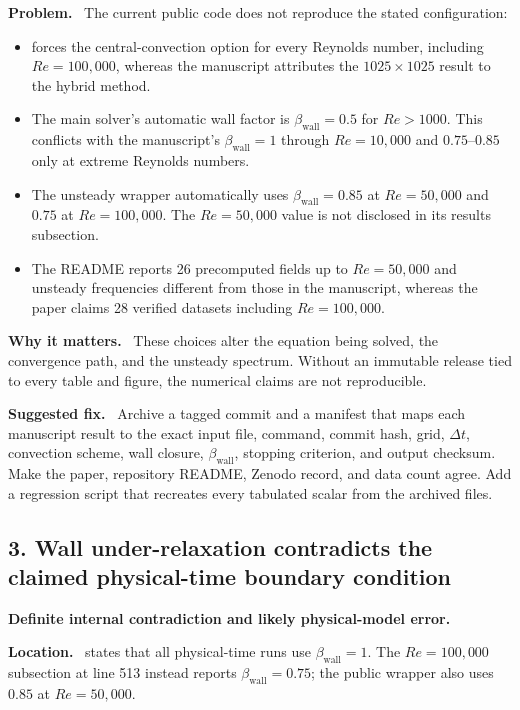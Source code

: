 \documentclass[11pt,a4paper]{article}
\newcommand{\classify}[1]{\textcolor{blue!65!black}{\textbf{#1}}}
\newcommand{\field}[1]{\par\noindent\textbf{#1}\ }
\begin{document}
\field{Problem.} The current public code does not reproduce the stated configuration:
\begin{itemize}
  \item {} forces the central-convection option for every Reynolds number, including $Re=100{,}000$, whereas the manuscript attributes the $1025\times1025$ result to the hybrid method.
  \item The main solver's automatic wall factor is $\beta_{\mathrm{wall}}=0.5$ for $Re>1000$. This conflicts with the manuscript's $\beta_{\mathrm{wall}}=1$ through $Re=10{,}000$ and $0.75$--$0.85$ only at extreme Reynolds numbers.
  \item The unsteady wrapper automatically uses $\beta_{\mathrm{wall}}=0.85$ at $Re=50{,}000$ and $0.75$ at $Re=100{,}000$. The $Re=50{,}000$ value is not disclosed in its results subsection.
  \item The README reports 26 precomputed fields up to $Re=50{,}000$ and unsteady frequencies different from those in the manuscript, whereas the paper claims 28 verified datasets including $Re=100{,}000$.
\end{itemize}

\field{Why it matters.} These choices alter the equation being solved, the convergence path, and the unsteady spectrum. Without an immutable release tied to every table and figure, the numerical claims are not reproducible.

\field{Suggested fix.} Archive a tagged commit and a manifest that maps each manuscript result to the exact input file, command, commit hash, grid, $\Delta t$, convection scheme, wall closure, $\beta_{\mathrm{wall}}$, stopping criterion, and output checksum. Make the paper, repository README, Zenodo record, and data count agree. Add a regression script that recreates every tabulated scalar from the archived files.

\subsection*{3. Wall under-relaxation contradicts the claimed physical-time boundary condition}

\classify{Definite internal contradiction and likely physical-model error.}

\field{Location.}  states that all physical-time runs use $\beta_{\mathrm{wall}}=1$. The $Re=100{,}000$ subsection at line 513 instead reports $\beta_{\mathrm{wall}}=0.75$; the public wrapper also uses $0.85$ at $Re=50{,}000$.
\end{document}
